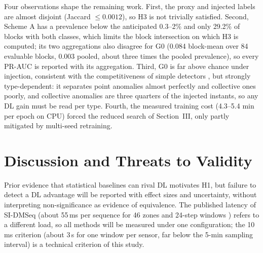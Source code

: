 \documentclass[conference]{IEEEtran}
\begin{document}
Four observations shape the remaining work. First, the proxy and injected
labels are almost disjoint (Jaccard $\leq0.0012$), so H3 is not trivially
satisfied. Second, Scheme A has a prevalence below the anticipated 0.3--2\% and only 29.2\% of
blocks with both classes, which limits the block intersection on which H3
is computed; its two aggregations also disagree for G0 (0.084 block-mean
over 84 evaluable blocks, 0.003 pooled, about three times the pooled
prevalence), so every PR-AUC is reported with its aggregation.
Third, G0 is far above chance under injection, consistent with
the competitiveness of simple detectors
\cite{taheri2026applicability,schmidl2022anomaly}, but strongly
type-dependent: it separates point anomalies almost perfectly and collective
ones poorly, and collective anomalies are three quarters of the injected
instants, so any DL gain must be read per type. Fourth, the measured
training cost (4.3--5.4 min per epoch on CPU) forced the reduced search of
Section~III, only partly mitigated by multi-seed retraining.

\section{Discussion and Threats to Validity}

Prior evidence that statistical baselines can rival DL
\cite{audibert2022deep,taheri2026applicability} motivates H1, but failure to
detect a DL advantage will be reported with effect sizes and uncertainty,
without interpreting non-significance as evidence of equivalence. The
published latency of SI-DMSeq (about 55\,ms per sequence for 46 zones and
24-step windows \cite{nouri2025sidmseq}) refers to a different load, so all
methods will be measured under one configuration; the 10\,ms criterion
(about 3\,s for one window per sensor, far below the 5-min sampling
interval) is a technical criterion of this study.
\end{document}
